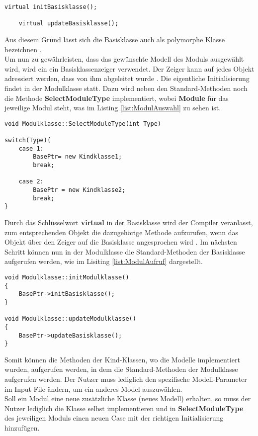 \begin{lstlisting}[label = {list:Basisklasse}, caption = Aufbau des Header-Files der Basisklasse,captionpos=b]
	virtual initBasisklasse();

	virtual updateBasisklasse();
\end{lstlisting}
Aus diesem Grund lässt sich die Basisklasse auch als polymorphe Klasse bezeichnen \cite{Wolf.2014}. \\
Um nun zu gewährleisten, dass das gewünschte Modell des Moduls ausgewählt wird, wird ein ein Basisklassenzeiger verwendet. Der Zeiger kann auf jedes Objekt adressiert werden, dass von ihm abgeleitet wurde \cite{Wolf.2014}. Die eigentliche Initialisierung findet in der Modulklasse statt. Dazu wird neben den Standard-Methoden noch die Methode \textbf{SelectModuleType} implementiert, wobei \textbf{Module} für das jeweilige Modul steht, was im Listing \ref{list:ModulAuswahl} zu sehen ist.\\
\begin{lstlisting}[label = {list:ModulAuswahl}, caption = Basisklassenzeiger im Modul.cpp File ,captionpos=b]
void Modulklasse::SelectModuleType(int Type)

switch(Type){
	case 1:
		BasePtr= new Kindklasse1;
		break;
	
	case 2: 
		BasePtr = new Kindklasse2;
		break;
}

\end{lstlisting}
Durch das Schlüsselwort \textbf{virtual} in der Basisklasse wird der Compiler veranlasst, zum entsprechenden Objekt die dazugehörige Methode aufzurufen, wenn das Objekt über den Zeiger auf die Basisklasse angesprochen wird \cite{Wolf.2014}. \newpage
Im nächsten Schritt können nun in der Modulklasse die Standard-Methoden der Basisklasse aufgerufen werden, wie im Lisiting \ref{list:ModulAufruf} dargestellt.
\begin{lstlisting}[label = {list:ModulAufruf}, caption = Aufruf der Standard-Methoden  im Modul.cpp File ,captionpos=b]
void Modulklasse::initModulklasse()
{
	BasePtr->initBasisklasse();
}

void Modulklasse::updateModulklasse()
{
	BasePtr->updateBasisklasse();
}
\end{lstlisting}

Somit können die Methoden der Kind-Klassen, wo die Modelle implementiert wurden, aufgerufen werden, in dem die Standard-Methoden der Modulklasse aufgerufen werden. Der Nutzer muss lediglich den spezifische Modell-Parameter im Input-File ändern, um ein anderes Model auszuwählen. \\Soll ein Modul eine neue zusätzliche Klasse (neues Modell) erhalten, so muss der Nutzer lediglich die Klasse selbst implementieren und in \textbf{SelectModuleType} des jeweiligen Moduls einen neuen Case mit der richtigen Initialisierung hinzufügen.
\newpage
